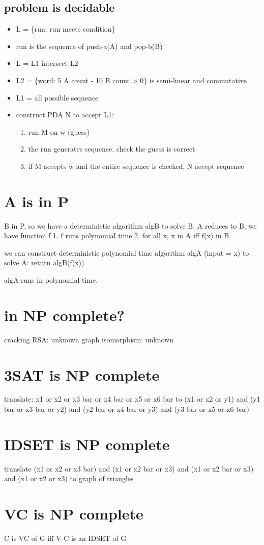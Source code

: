 \documentclass{article}
\begin{document}
\subsection{problem is decidable}
\begin{itemize}
	\item L = \{run: run meets condition\}
	\item run is the sequence of push-a(A) and pop-b(B)
	\item L = L1 intersect L2
	\item L2 = \{word: 5 A count - 10 B count > 0\} is semi-linear and commutative
	\item L1 = all possible sequence
	\item construct PDA N to accept L1:
	\begin{enumerate}
		\item run M on w (guess)
		\item the run generates sequence, check the guess is correct
		\item if M accepts w and the entire sequence is checked, N accept sequence
	\end{enumerate}
\end{itemize}

\section{A is in P}
B in P, so we have a deterministic algorithm algB to solve B.
A reduces to B, we have function f
1. f runs polynomial time
2. for all x, x in A iff f(x) in B

we can construct deterministic polynomial time algorithm algA (input = x) to solve A:
return algB(f(x))

algA runs in polynomial time.

\section{in NP complete?}
cracking RSA: unknown
graph isomorphism: unknown

\section{3SAT is NP complete}
translate: x1 or x2 or x3 bar or x4 bar or x5 or x6 bar to (x1 or x2 or y1) and 
(y1 bar or x3 bar or y2) and (y2 bar or x4 bar or y3) and (y3 bar or x5 or x6 
bar)

\section{IDSET is NP complete}
translate (x1 or x2 or x3 bar) and (x1 or x2 bar or x3) and (x1 or x2 bar or 
x3) and (x1 or x2 or x3) to graph of triangles

\section{VC is NP complete}
C is VC of G iff V-C is an IDSET of G
\end{document}
